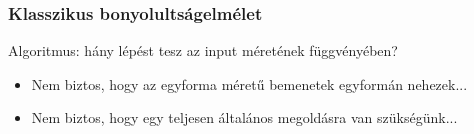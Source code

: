 \begin{frame}
\frametitle{Klasszikus bonyolultságelmélet}

Algoritmus: hány lépést tesz az input méretének függvényében?

\begin{itemize}
\item Nem biztos, hogy az egyforma méretű bemenetek egyformán nehezek...
\item Nem biztos, hogy egy teljesen általános megoldásra van szükségünk...
\end{itemize}

\end{frame}

